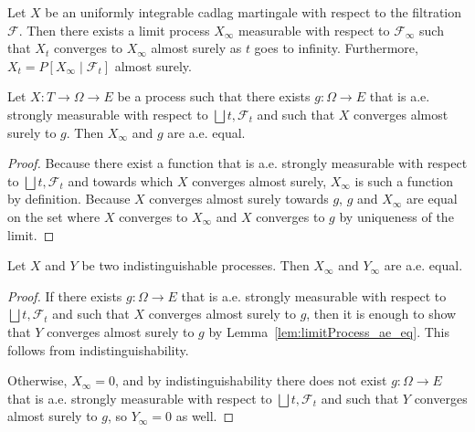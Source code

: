 \begin{theorem}\label{thm:tendsto_limitProcess_of_cadlag}
  \leanok
Let $X$ be an uniformly integrable cadlag martingale with respect to the filtration $\mathcal{F}$.
Then there exists a limit process $X_\infty$ measurable with respect to $\mathcal{F}_\infty$ such that $X_t$ converges to $X_\infty$ almost surely as $t$ goes to infinity.
Furthermore, $X_t = P[X_\infty \mid \mathcal{F}_t]$ almost surely.
\end{theorem}

\begin{lemma}\label{lem:limitProcess_ae_eq}
  \mathlibok
Let $X : T \to \Omega \to E$ be a process such that there exists $g : \Omega \to E$ that is a.e. strongly measurable with respect to $\bigsqcup t, \mathcal{F}_t$ and such that $X$ converges almost surely to $g$. Then $X_\infty$ and $g$ are a.e. equal.
\end{lemma}

\begin{proof}\mathlibok
  Because there exist a function that is a.e. strongly measurable with respect to $\bigsqcup t, \mathcal{F}_t$ and towards which $X$ converges almost surely, $X_\infty$ is such a function by definition. Because $X$ converges almost surely towards $g$, $g$ and $X_\infty$ are equal on the set where $X$ converges to $X_\infty$ and $X$ converges to $g$ by uniqueness of the limit.
\end{proof}

\begin{lemma}\label{lem:limitProcess_congr}
  \mathlibok
  Let $X$ and $Y$ be two indistinguishable processes. Then $X_\infty$ and $Y_\infty$ are a.e. equal.
\end{lemma}

\begin{proof}\mathlibok
  If there exists $g : \Omega \to E$ that is a.e. strongly measurable with respect to $\bigsqcup t, \mathcal{F}_t$ and such that $X$ converges almost surely to $g$, then it is enough to show that $Y$ converges almost surely to $g$ by Lemma~\ref{lem:limitProcess_ae_eq}. This follows from indistinguishability.

  Otherwise, $X_\infty = 0$, and by indistinguishability there does not exist $g : \Omega \to E$ that is a.e. strongly measurable with respect to $\bigsqcup t, \mathcal{F}_t$ and such that $Y$ converges almost surely to $g$, so $Y_\infty = 0$ as well.
\end{proof}

